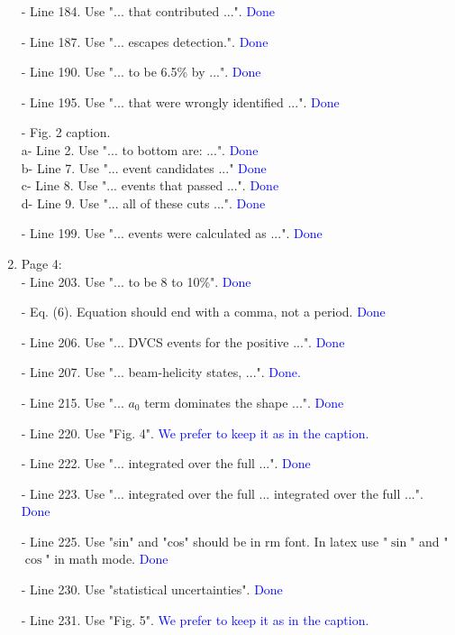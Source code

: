 \documentclass[a4paper,11pt,twoside]{article}
\begin{document}
\begin{enumerate}
- Line 184. Use "... that contributed ...".
     \textcolor{blue}{Done}

- Line 187. Use "... escapes detection.".
     \textcolor{blue}{Done }

- Line 190. Use "... to be 6.5\% by ...".
     \textcolor{blue}{Done }

- Line 195. Use "... that were wrongly identified ...".
     \textcolor{blue}{Done}

- Fig. 2 caption.\\
   a- Line 2. Use "... to bottom are: ...".
    \textcolor{blue}{Done}\\
   b- Line 7. Use "... event candidates ..."
    \textcolor{blue}{Done}\\
   c- Line 8. Use "... events that passed ...".
    \textcolor{blue}{Done}\\
   d- Line 9. Use "... all of these cuts ...".
    \textcolor{blue}{Done}

 - Line 199. Use "... events were calculated as ...".
    \textcolor{blue}{Done}
~\\
\item Page 4:\\
 - Line 203. Use "... to be 8 to 10\%".
     \textcolor{blue}{Done}

- Eq. (6). Equation should end with a comma, not a period.
      \textcolor{blue}{Done}

- Line 206. Use "... DVCS events for the positive ...".
      \textcolor{blue}{Done}

- Line 207. Use "... beam-helicity states, ...".
      \textcolor{blue}{Done.}

- Line 215. Use "... $a_0$ term dominates the shape ...".
      \textcolor{blue}{Done}

- Line 220. Use "Fig. 4".
      \textcolor{blue}{We prefer to keep it as in the caption.}

- Line 222. Use "... integrated over the full ...".
      \textcolor{blue}{Done}

- Line 223. Use "... integrated over the full  ... integrated over the full 
  ...".
      \textcolor{blue}{Done}

- Line 225. Use "sin" and "cos" should be in rm font. In latex use "$\sin$" and 
  "$\cos$" in math mode.
      \textcolor{blue}{Done}

- Line 230. Use "statistical uncertainties".
      \textcolor{blue}{Done}

- Line 231. Use "Fig. 5".
      \textcolor{blue}{We prefer to keep it as in the caption.}


\end{enumerate}
\end{document}
